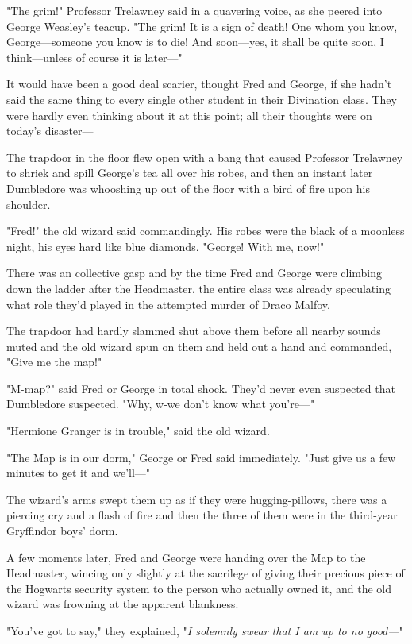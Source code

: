 "The grim!" Professor Trelawney said in a quavering voice, as she peered into
George Weasley's teacup. "The grim! It is a sign of death! One whom you know,
George---someone you know is to die! And soon---yes, it shall be quite soon, I
think---unless of course it is later---"

It would have been a good deal scarier, thought Fred and George, if she hadn't
said the same thing to every single other student in their Divination class.
They were hardly even thinking about it at this point; all their thoughts were
on today's disaster---

The trapdoor in the floor flew open with a bang that caused Professor Trelawney
to shriek and spill George's tea all over his robes, and then an instant later
Dumbledore was whooshing up out of the floor with a bird of fire upon his
shoulder.

"Fred!" the old wizard said commandingly. His robes were the black of a
moonless night, his eyes hard like blue diamonds. "George! With me, now!"

There was an collective gasp and by the time Fred and George were climbing down
the ladder after the Headmaster, the entire class was already speculating what
role they'd played in the attempted murder of Draco Malfoy.

The trapdoor had hardly slammed shut above them before all nearby sounds muted
and the old wizard spun on them and held out a hand and commanded, "Give me the
map!"

"M-map?" said Fred or George in total shock. They'd never even suspected that
Dumbledore suspected. "Why, w-we don't know what you're---"

"Hermione Granger is in trouble," said the old wizard.

"The Map is in our dorm," George or Fred said immediately. "Just give us a few
minutes to get it and we'll---"

The wizard's arms swept them up as if they were hugging-pillows, there was a
piercing cry and a flash of fire and then the three of them were in the
third-year Gryffindor boys' dorm.

A few moments later, Fred and George were handing over the Map to the
Headmaster, wincing only slightly at the sacrilege of giving their precious
piece of the Hogwarts security system to the person who actually owned it, and
the old wizard was frowning at the apparent blankness.

"You've got to say," they explained, "\emph{I solemnly swear that I am up to no
good---}"

